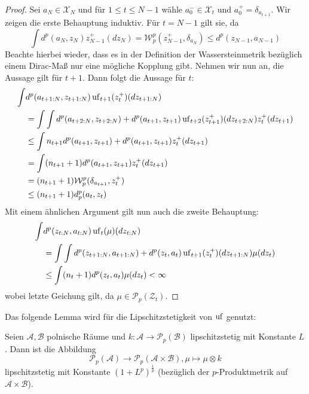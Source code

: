 \begin{proof}
Sei $a_N \in \mathcal{X}_N$ und für $1\leq t \leq N-1$ wähle $a_0^-\in\mathcal{X}_t$ und $a_0^+ = \delta_{a_{t+1}}$. 
Wir zeigen die erste Behauptung induktiv. Für $t=N-1$ gilt sie, da
$$\int d^p(a_N, z_N)z_{N-1}^+(dz_N)=\mathcal{W}_p^p(z_{N-1}^+, \delta_{a_N}) \leq d^p(z_{N-1}, a_{N-1})$$
Beachte hierbei wieder, dass es in der Definition der Wassersteinmetrik bezüglich einem Dirac-Maß nur eine mögliche Kopplung gibt. Nehmen wir nun an, die Aussage gilt für $t+1$. Dann folgt die Aussage für $t$:
\begin{align*}
\int &d^p(a_{t+1:N}, z_{t+1:N}) \operatorname{uf}_{t+1}(z_t^+)(dz_{t+1:N}) \\
&= \int\int d^p(a_{t+2:N}, z_{t+2:N}) + d^p(a_{t+1}, z_{t+1}) \operatorname{uf}_{t+2}(z_{t+1}^+)(dz_{t+2:N})z_t^+(dz_{t+1}) \\
&\leq \int n_{t+1}d^p(a_{t+1}, z_{t+1}) + d^p(a_{t+1}, z_{t+1}) z_t^+(dz_{t+1}) \\
&= \int (n_{t+1}+1)d^p(a_{t+1}, z_{t+1}) z_t^+(dz_{t+1}) \\
&= (n_{t+1}+1)\mathcal{W}_p^p(\delta_{a_{t+1}}, z_t^+) \\
&\leq (n_{t+1}+1)d_p^p(a_t, z_t)
\end{align*}
Mit einem ähnlichen Argument gilt nun auch die zweite Behauptung:
\begin{align*}
\int &d^p(z_{t:N}, a_{t:N})\operatorname{uf}_{t}(\mu)(dz_{t:N}) \\
&= \int\int d^p(z_{t+1:N}, a_{t+1:N})+d^p(z_t, a_t)\operatorname{uf}_{t+1}(z_t^+)(dz_{t+1:N})\mu(dz_t) \\
&\leq \int (n_{t}+1)d^p(z_t, a_t)\mu(dz_t) < \infty
\end{align*}
wobei letzte Geichung gilt, da $\mu \in\mathcal{P}_p(\mathcal{Z}_t)$.
\end{proof}
Das folgende Lemma wird für die Lipschitzstetigkeit von $\operatorname{uf}$ genutzt:
\begin{lemma}\label{thm:lipschitz_continuous_kernel}
    Seien $\mathcal{A,B}$ polnische Räume und $k: \mathcal{A} \rightarrow \mathcal{P}_p(\mathcal{B})$ lipschitzstetig mit Konstante $L$. Dann ist die Abbildung 
    $$\mathcal{P}_p(\mathcal{A}) \rightarrow \mathcal{P}_p(\mathcal{A} \times \mathcal{B}), \mu \mapsto \mu \otimes k$$
    lipschitzstetig mit Konstante $(1+L^p)^\frac{1}{p}$ (bezüglich der $p$-Produktmetrik auf $\mathcal{A}\times \mathcal{B}$).
\end{lemma}
